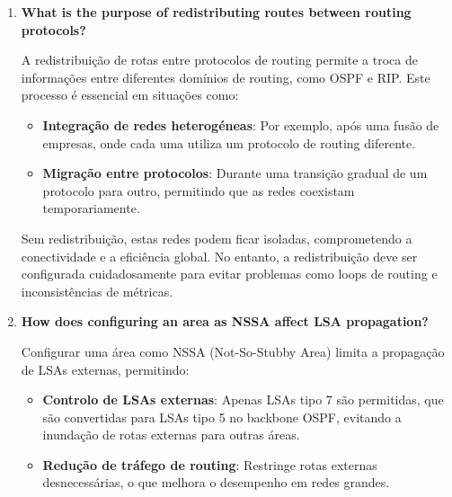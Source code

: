 \documentclass[11pt,english, openright, oneside]{book}
\begin{document}
\begin{enumerate}
  \item \textbf{What is the purpose of redistributing routes between routing protocols?}
  \vspace{0.2cm}

  \par A redistribuição de rotas entre protocolos de routing permite a troca de informações entre diferentes domínios de routing, como OSPF e RIP. Este processo é essencial em situações como:
  \vspace{0.2cm}

  \begin{itemize}
    \item \textbf{Integração de redes heterogéneas}: Por exemplo, após uma fusão de empresas, onde cada uma utiliza um protocolo de routing diferente.
    \item \textbf{Migração entre protocolos}: Durante uma transição gradual de um protocolo para outro, permitindo que as redes coexistam temporariamente.
  \end{itemize}
  \vspace{0.2cm}

  Sem redistribuição, estas redes podem ficar isoladas, comprometendo a conectividade e a eficiência global. No entanto, a redistribuição deve ser configurada cuidadosamente para evitar problemas como loops de routing e inconsistências de métricas.
  \vspace{0.2cm}

  \item \textbf{How does configuring an area as NSSA affect LSA propagation?}
  \vspace{0.2cm}

  \par Configurar uma área como NSSA (Not-So-Stubby Area) limita a propagação de LSAs externas, permitindo:
  \vspace{0.2cm}

  \begin{itemize}
    \item \textbf{Controlo de LSAs externas}: Apenas LSAs tipo 7 são permitidas, que são convertidas para LSAs tipo 5 no backbone OSPF, evitando a inundação de rotas externas para outras áreas.
    \item \textbf{Redução de tráfego de routing}: Restringe rotas externas desnecessárias, o que melhora o desempenho em redes grandes.
  \end{itemize}
  \vspace{0.2cm}


\end{enumerate}
\end{document}
